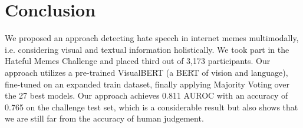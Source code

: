 \documentclass{article}
\begin{document}
\section{Conclusion}
\label{discussion}
  We proposed an approach detecting hate speech in internet memes multimodally, i.e. considering visual and textual information holistically. We took part in the Hateful Memes Challenge and placed third out of 3,173 participants. Our approach utilizes a pre-trained VisualBERT (a BERT of vision and language), fine-tuned on an expanded train dataset, finally applying Majority Voting over the 27 best models. Our approach achieves 0.811 AUROC with an accuracy of 0.765 on the challenge test set, which is a considerable result but also shows that we are still far from the accuracy of human judgement.   

\small


\end{document}
